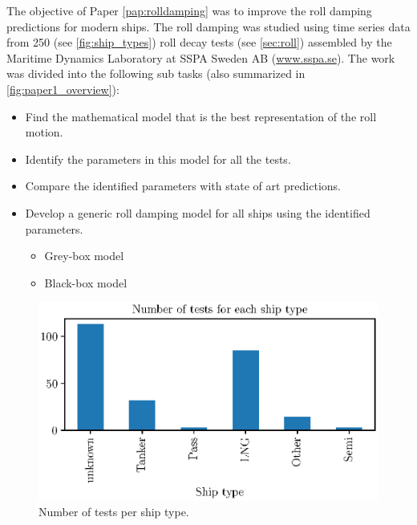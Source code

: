 The objective of Paper \ref{pap:rolldamping} was to improve the roll damping predictions for modern ships. The roll damping was studied using time series data from 250 (see \autoref{fig:ship_types}) roll decay tests (see \autoref{sec:roll}) assembled by the Maritime Dynamics Laboratory at SSPA Sweden AB (\href{www.sspa.se}{www.sspa.se}). The work was divided into the following sub tasks (also summarized in \autoref{fig:paper1_overview}): 
\vspace{5pt}
\begin{itemize}
    \setlength\itemsep{5pt}
    \item Find the mathematical model that is the best representation of the roll motion.
    \item Identify the parameters in this model for all the tests.
    \item Compare the identified parameters with state of art predictions.
    \item Develop a generic roll damping model for all ships using the identified parameters.
    \begin{itemize}
        \item Grey-box model
        \item Black-box model
    \end{itemize}
\end{itemize}
\vspace{5pt}
\begin{figure}[!htb]
    \centering
    \includegraphics[width=0.6\columnwidth]{kappa/images/ship_types.eps}
    \caption{Number of tests per ship type.}
    \label{fig:ship_types}
\end{figure}
